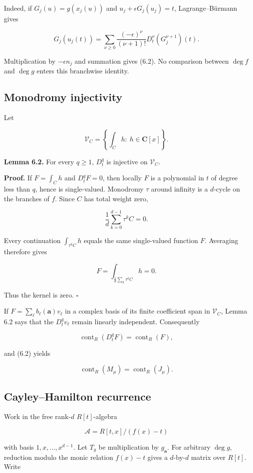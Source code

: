 \documentclass[
  11pt,
  a4paper,
]{amsart}
\begin{document}
Indeed, if \(G_j(u)=g(x_j(u))\) and \(u_j+\epsilon G_j(u_j)=t\),
Lagrange--Bürmann gives

\[
G_j(u_j(t))=\sum_{\nu\ge0}\frac{(-\epsilon)^\nu}{(\nu+1)!}
D_t^\nu(G_j^{\nu+1})(t).
\]

Multiplication by \(-\epsilon n_j\) and summation gives (6.2). No
comparison between \(\deg f\) and \(\deg g\) enters this branchwise
identity.

\subsection{Monodromy injectivity}

Let

\[
\mathcal V_C=\left\{\int_Ch:\ h\in\mathbf C[x]\right\}.
\]

\textbf{Lemma 6.2.} For every \(q\ge1\), \(D_t^q\) is injective on
\(\mathcal V_C\).

\textbf{Proof.} If \(F=\int_Ch\) and \(D_t^qF=0\), then locally \(F\) is
a polynomial in \(t\) of degree less than \(q\), hence is single-valued.
Monodromy \(\tau\) around infinity is a \(d\)-cycle on the branches of
\(f\). Since \(C\) has total weight zero,

\[
\frac1d\sum_{k=0}^{d-1}\tau^kC=0.
\]

Every continuation \(\int_{\tau^kC}h\) equals the same single-valued
function \(F\). Averaging therefore gives

\[
F=\int_{\frac1d\sum_k\tau^kC}h=0.
\]

Thus the kernel is zero. \(\square\)

If \(F=\sum_\ell b_\ell(\boldsymbol a)v_\ell\) in a complex basis of its
finite coefficient span in \(\mathcal V_C\), Lemma 6.2 says that the
\(D_t^qv_\ell\) remain linearly independent. Consequently

\[
\operatorname{cont}_R(D_t^qF)=\operatorname{cont}_R(F),           \tag{6.3}
\]

and (6.2) yields

\[
\operatorname{cont}_R(M_\mu)=\operatorname{cont}_R(J_\mu).       \tag{6.4}
\]

\subsection{Cayley--Hamilton recurrence}

Work in the free rank-\(d\) \(R[t]\)-algebra

\[
\mathcal A=R[t,x]/(f(x)-t)
\]

with basis \(1,x,\ldots,x^{d-1}\). Let \(T_g\) be multiplication by
\(g_{\boldsymbol a}\). For arbitrary \(\deg g\), reduction modulo the
monic relation \(f(x)-t\) gives a \(d\)-by-\(d\) matrix over \(R[t]\).
Write
\end{document}
